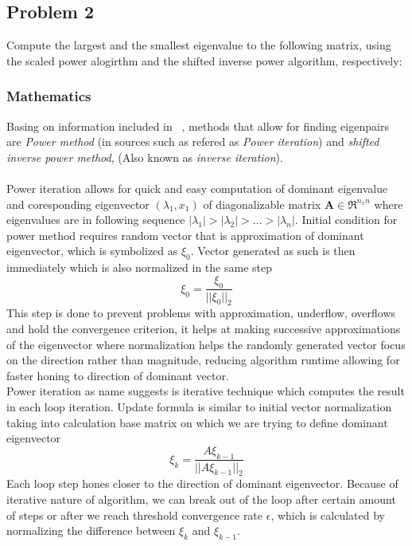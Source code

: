 \subsection{Problem 2}
\label{sec:problem_2}


Compute the largest and the smallest eigenvalue to the following matrix, using the
scaled power alogirthm and the shifted inverse power algorithm, respectively:

\subsubsection*{Mathematics}
Basing on information included in ~\cite{Zdunek}, methods that allow for finding eigenpairs are \textit{Power method} 
(in sources such as refered as \textit{Power iteration}) and \textit{shifted inverse power method}, (Also known as \textit{inverse iteration}\cite{Demmel}).\\
\\
Power iteration allows for quick and easy computation of dominant eigenvalue and coresponding eigenvector $(\lambda_1, x_1)$ of diagonalizable matrix 
\textbf{A}$\in \mathfrak{R}^{n_xn}$ where eigenvalues are in following sequence $|\lambda_1| > |\lambda_2| > ... > |\lambda_n|$.
Initial condition for power method requires random vector that is approximation of dominant eigenvector, which is symbolized as $\xi_0$. Vector generated as such is then immediately which is also normalized in the same step 
\begin{equation*}
    \xi_0 = \frac{\xi_0}{||\xi_0||_2} 
\end{equation*}
This step is done to prevent problems with approximation, underflow, overflows and hold the convergence criterion, it helps at making successive approximations of the eigenvector where normalization helps the randomly generated vector focus on the direction rather than magnitude, reducing algorithm runtime allowing for faster honing to direction of dominant vector.\\
Power iteration as name suggests is iterative technique which computes the result in each loop iteration.
Update formula is similar to initial vector normalization taking into calculation base matrix on which we are trying to define dominant eigenvector
\begin{equation*}
    \xi_k = \frac{A \xi_{k-1}}{||A \xi_{k-1}||_2}
\end{equation*}
Each loop step hones closer to the direction of dominant eigenvector. Because of iterative nature of algorithm, we can break out of the loop after certain amount of steps or after we reach threshold convergence rate $\epsilon$, which is calculated by normalizing the difference between $\xi_k$ and $\xi_{k-1}$.
